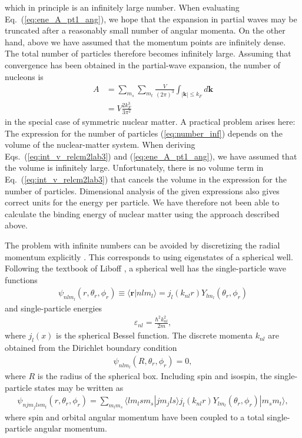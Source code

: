 \documentclass[a4paper,12pt]{report}
\begin{document}
which in principle is an infinitely large number.
When evaluating Eq.~(\ref{eq:ene_A_pt1_ang}), we hope that
the expansion in partial waves may be truncated after
a reasonably small number of angular momenta.
On the other hand, above we have assumed that the 
momentum points are infinitely dense. The total number
of particles therefore becomes infinitely large.
Assuming that convergence has been obtained
in the partial-wave expansion, the number of nucleons is
\begin{align} \label{eq:number_inf}
  A &= \sum_{m_{s}}\sum_{m_{t}}\frac{V}{(2\pi )^{3}}
  \int_{|\mathbf{k}| \leq k_{F}}d\mathbf{k} \nonumber \\
  &= V \frac{2k_{F}^{3}}{3\pi^{2}}
\end{align}
in the special case of symmetric nuclear matter. 
A practical problem arises here: The expression for
the number of particles (\ref{eq:number_inf}) depends on 
the volume of the nuclear-matter system. When deriving
Eqs.~(\ref{eq:int_v_relcm2lab3}) and (\ref{eq:ene_A_pt1_ang}),
we have assumed that the volume is infinitely large. 
Unfortunately, there is no volume term in 
Eq.~(\ref{eq:int_v_relcm2lab3}) that cancels the volume
in the expression for the number of particles. Dimensional
analysis of the given expressions also gives correct
units for the energy per particle. We have therefore
not been able to calculate the binding energy of
nuclear matter using the approach described above.

The problem with infinite numbers can be avoided 
by discretizing the radial momentum explicitly 
\cite{papenbrock_notes}. This
corresponds to using eigenstates of a spherical well.
Following the textbook of Liboff \cite{liboff}, a
spherical well has the single-particle wave functions
\begin{align} \label{eq:psi_radial_discr}
  \psi_{nlm_{l}}(r, \theta_{r}, \phi_{r}) \equiv
  \langle \mathbf{r}| nlm_{l}\rangle = 
  j_{l}(k_{nl}r)Y_{lm_{l}}(\theta_{r}, \phi_{r})
\end{align} 
and single-particle energies
\begin{align}
  \varepsilon_{nl} = \frac{\hbar^{2}k_{nl}^{2}}{2m},
\end{align}
where $j_{l}(x)$ is the spherical Bessel function.  
The discrete momenta $k_{nl}$ are obtained from the 
Dirichlet boundary condition
\begin{align}
  \psi_{nlm_{l}}(R, \theta_{r}, \phi_{r}) = 0,
\end{align}
where $R$ is the radius of the spherical box. 
Including spin and isospin, the single-particle states
may be written as
\begin{align} \label{eq:discr_njl}
  \psi_{njm_{j}lsm_{t}}(r, \theta_{r}, \phi_{r}) = 
  \sum_{m_{l}m_{s}}\langle lm_{l}sm_{s}|jm_{j}ls\rangle
  j_{l}(k_{nl}r)Y_{lm_{l}}(\theta_{r}, \phi_{r})|m_{s}m_{t}\rangle ,
\end{align}
where spin and orbital angular momentum have been
coupled to a total single-particle angular momentum.
\end{document}
